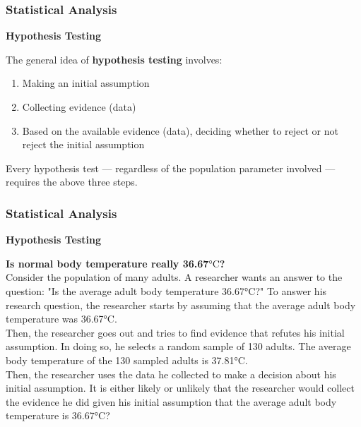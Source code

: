 \documentclass{beamer}
\begin{document}
\begin{frame}
\frametitle{Statistical Analysis}
\textbf{Hypothesis Testing}\\
\vspace{0.5cm}
\begin{tcolorbox}
The general idea of \textbf{hypothesis testing} involves:
\vspace{0.2cm}
\begin{enumerate}
\item Making an initial assumption
\vspace{0.2cm}
\item Collecting evidence (data)
\vspace{0.2cm}
\item Based on the available evidence (data), deciding whether to reject or not reject the initial assumption
\end{enumerate}
\end{tcolorbox}
\vspace{0.2cm}
Every hypothesis test — regardless of the population parameter involved — requires the above three steps.
\end{frame}


\begin{frame}
\frametitle{Statistical Analysis}
\textbf{Hypothesis Testing}\\
\begin{example}
\textbf{Is normal body temperature really 36.67$\si{\degreeCelsius}$?}\\
\vspace{0.1cm}
Consider the population of many adults. A researcher wants an answer to the question: "Is the average adult body temperature 36.67$\si{\degreeCelsius}$?" To answer his research question, the researcher starts by assuming that the average adult body temperature was 36.67$\si{\degreeCelsius}$.\\
\vspace{0.1cm}
Then, the researcher goes out and tries to find evidence that refutes his initial assumption. In doing so, he selects a random sample of 130 adults. The average body temperature of the 130 sampled adults is 37.81$\si{\degreeCelsius}$.\\
\vspace{0.1cm}
Then, the researcher uses the data he collected to make a decision about his initial assumption. It is either likely or unlikely that the researcher would collect the evidence he did given his initial assumption that the average adult body temperature is 36.67$\si{\degreeCelsius}$?
\end{example}
\end{frame}
\end{document}
